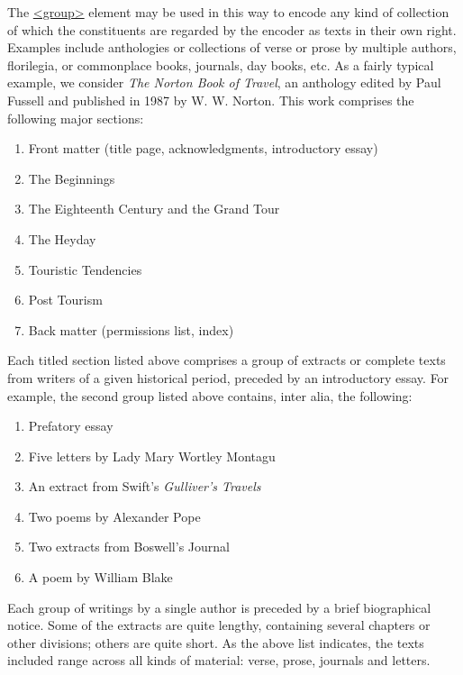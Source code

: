 The \hyperref[TEI.group]{<group>} element may be used in this way to encode any kind of collection of which the constituents are regarded by the encoder as texts in their own right. Examples include anthologies or collections of verse or prose by multiple authors, florilegia, or commonplace books, journals, day books, etc. As a fairly typical example, we consider \textit{The Norton Book of Travel}, an anthology edited by Paul Fussell and published in 1987 by W. W. Norton. This work comprises the following major sections: \begin{enumerate}
\item Front matter (title page, acknowledgments, introductory essay)
\item The Beginnings
\item The Eighteenth Century and the Grand Tour
\item The Heyday
\item Touristic Tendencies
\item Post Tourism
\item Back matter (permissions list, index)
\end{enumerate} Each titled section listed above comprises a group of extracts or complete texts from writers of a given historical period, preceded by an introductory essay. For example, the second group listed above contains, inter alia, the following: \begin{enumerate}
\item Prefatory essay
\item Five letters by Lady Mary Wortley Montagu
\item An extract from Swift's \textit{Gulliver's Travels}
\item Two poems by Alexander Pope
\item Two extracts from Boswell's Journal
\item A poem by William Blake
\end{enumerate} Each group of writings by a single author is preceded by a brief biographical notice. Some of the extracts are quite lengthy, containing several chapters or other divisions; others are quite short. As the above list indicates, the texts included range across all kinds of material: verse, prose, journals and letters.\par
